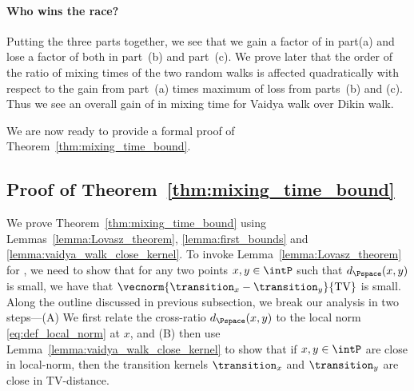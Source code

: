 \paragraph{Who wins the race?} %
\label{par:who_wins_the_race_}
Putting the three parts together, we see that we gain a factor of \order{\sqrt{\obs/\dims}} in part(a) and lose a factor of  both in part~(b) and part~(c).
We prove later that the order of the ratio of mixing times of the two random walks is affected quadratically with respect to the gain from part~(a) times maximum of loss from parts~(b) and (c).
Thus we see an overall gain of \order{\sqrt{\obs/\dims}} in mixing time for Vaidya walk over Dikin walk.

We are now ready to provide a formal proof of Theorem~\ref{thm:mixing_time_bound}.

\subsection{Proof of Theorem~\ref{thm:mixing_time_bound}} %
\label{sub:proof_of_theorem_thm:mixing_time_bound}

We prove Theorem~\ref{thm:mixing_time_bound} using Lemmas~\ref{lemma:Lovasz_theorem}, \ref{lemma:first_bounds} and \ref{lemma:vaidya_walk_close_kernel}.
To invoke Lemma~\ref{lemma:Lovasz_theorem} for , we need to show that for any two points $x, y \in \intP$ such that $d_\Pspace(x, y)$ is small, we have that $\vecnorm{\transition_x-\transition_y}{\text{TV}}$ is small.
Along the outline discussed in previous subsection, we break our analysis in two steps---(A) We first relate the cross-ratio $d_\Pspace(x, y)$ to the local norm \eqref{eq:def_local_norm} at $x$, and (B) then  use Lemma~\ref{lemma:vaidya_walk_close_kernel} to show that if $x, y \in \intP$ are close in local-norm, then the transition kernels $\transition_x$ and $\transition_y$ are close in TV-distance.

